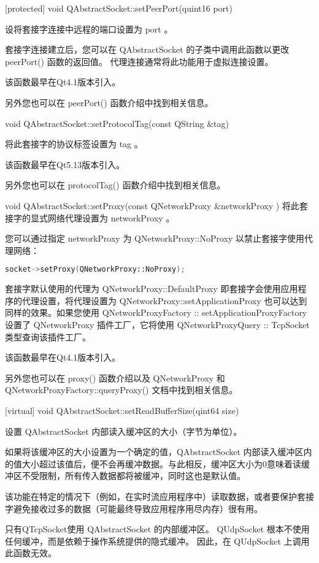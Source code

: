 [protected] void QAbstractSocket::setPeerPort(quint16 port)

设将套接字连接中远程的端口设置为 port 。

套接字连接建立后，您可以在 QAbstractSocket 的子类中调用此函数以更改 peerPort() 函数的返回值。 代理连接通常将此功能用于虚拟连接设置。

该函数最早在Qt4.1版本引入。

另外您也可以在 peerPort() 函数介绍中找到相关信息。

void QAbstractSocket::setProtocolTag(const QString \&tag)

将此套接字的协议标签设置为 tag 。

该函数最早在Qt5.13版本引入。

另外您也可以在 protocolTag() 函数介绍中找到相关信息。

void QAbstractSocket::setProxy(const QNetworkProxy \&networkProxy )
将此套接字的显式网络代理设置为 networkProxy 。

您可以通过指定 networkProxy 为 QNetworkProxy::NoProxy 以禁止套接字使用代理网络：


\begin{lstlisting}[language=C++]
socket->setProxy(QNetworkProxy::NoProxy);
\end{lstlisting} 


套接字默认使用的代理为 QNetworkProxy::DefaultProxy 即套接字会使用应用程序的代理设置，将代理设置为 QNetworkProxy::setApplicationProxy 也可以达到同样的效果。如果您使用 QNetworkProxyFactory :: setApplicationProxyFactory 设置了 QNetworkProxy 插件工厂，它将使用 QNetworkProxyQuery :: TcpSocket 类型查询该插件工厂。

该函数最早在Qt4.1版本引入。

另外您也可以在 proxy() 函数介绍以及 QNetworkProxy 和 QNetworkProxyFactory::queryProxy() 文档中找到相关信息。

[virtual] void QAbstractSocket::setReadBufferSize(qint64 size)

设置 QAbstractSocket 内部读入缓冲区的大小（字节为单位）。

如果将该缓冲区的大小设置为一个确定的值，QAbstractSocket 内部读入缓冲区内的值大小超过该值后，便不会再缓冲数据。与此相反，缓冲区大小为0意味着读缓冲区不受限制，所有传入数据都将被缓冲，同时这也是默认值。

该功能在特定的情况下（例如，在实时流应用程序中）读取数据，或者要保护套接字避免接收过多的数据（可能最终导致应用程序用尽内存）很有用。

只有QTcpSocket使用 QAbstractSocket 的内部缓冲区。 QUdpSocket 根本不使用任何缓冲，而是依赖于操作系统提供的隐式缓冲。 因此，在 QUdpSocket 上调用此函数无效。

